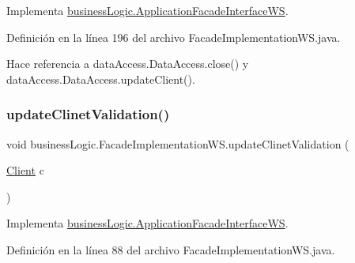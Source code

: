 Implementa \mbox{\hyperlink{interfacebusiness_logic_1_1_application_facade_interface_w_s_a2d053769d923bd1987f8fd1f875905e7}{business\+Logic.\+Application\+Facade\+Interface\+WS}}.



Definición en la línea 196 del archivo Facade\+Implementation\+W\+S.\+java.


\begin{DoxyCode}{0}

\end{DoxyCode}


Hace referencia a data\+Access.\+Data\+Access.\+close() y data\+Access.\+Data\+Access.\+update\+Client().

\mbox{\label{classbusiness_logic_1_1_facade_implementation_w_s_aa1ef9c26fc3278ef6c4170094ed6dcaa}} 
\subsubsection{\texorpdfstring{updateClinetValidation()}{updateClinetValidation()}}
{\footnotesize\ttfamily void business\+Logic.\+Facade\+Implementation\+W\+S.\+update\+Clinet\+Validation (\begin{DoxyParamCaption}\item[{\mbox{\hyperlink{classdomain_1_1_client}{Client}}}]{c }\end{DoxyParamCaption})}



Implementa \mbox{\hyperlink{interfacebusiness_logic_1_1_application_facade_interface_w_s_a482571287e471d0047bc24150f716d72}{business\+Logic.\+Application\+Facade\+Interface\+WS}}.



Definición en la línea 88 del archivo Facade\+Implementation\+W\+S.\+java.


\begin{DoxyCode}{0}

\end{DoxyCode}


